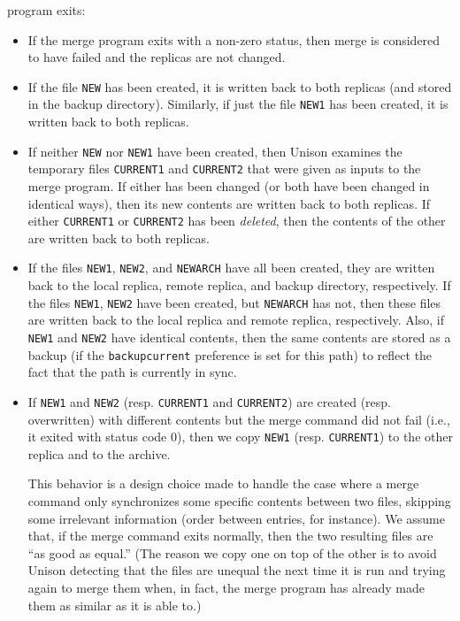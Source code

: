 \documentclass{article}
\begin{document}
program exits:
\begin{itemize}
\item If the merge program exits with a non-zero status, then merge is
  considered to have failed and the replicas are not changed.
\item If the file \verb|NEW| has been created, it is written back to both
  replicas (and stored in the backup directory).  Similarly, if just the
  file \verb|NEW1| has been created, it is written back to both
  replicas.
\item If neither \verb|NEW| nor \verb|NEW1| have been created, then Unison
  examines the temporary files \verb|CURRENT1|  and \verb|CURRENT2| that
  were given as inputs to the merge program.  If either has been changed (or
  both have been changed in identical ways), then its new contents are written
  back to both replicas.  If either \verb|CURRENT1| or \verb|CURRENT2| has
  been {\em deleted}, then the contents of the other are written back to
  both replicas.
\item If the files \verb|NEW1|, \verb|NEW2|, and \verb|NEWARCH| have all
  been created, they are written back to the local replica, remote replica,
  and backup directory, respectively. If the files \verb|NEW1|, \verb|NEW2| have
  been created, but \verb|NEWARCH| has not, then these files are written back to the
  local replica and remote replica, respectively.  Also, if \verb|NEW1| and
  \verb|NEW2| have identical contents, then the same contents are stored as
  a backup (if the \verb|backupcurrent| preference is set for this path) to
  reflect the fact that the path is currently in sync.
  \item If \verb|NEW1| and \verb|NEW2| (resp. \verb|CURRENT1| and
  \verb|CURRENT2|) are created (resp. overwritten) with different contents
  but the merge command did not fail (i.e., it exited with status code 0),
  then we copy \verb|NEW1| (resp. \verb|CURRENT1|) to the other replica and
  to the archive.

  This behavior is a design choice made to handle the case where a merge
  command only synchronizes some specific contents between two files,
  skipping some irrelevant information (order between entries, for
  instance).  We assume that, if the merge command exits normally, then the
  two resulting files are ``as good as equal.'' (The reason we copy one on
  top of the other is to avoid Unison detecting that the files are unequal
  the next time it is run and trying again to merge them when, in fact, the
  merge program has already made them as similar as it is able to.)
\end{itemize}
\end{document}
